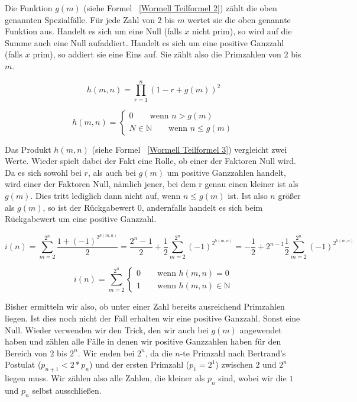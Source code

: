 \documentclass[11pt]{scrartcl}
\begin{document}
Die Funktion $g(m)$ (siehe Formel ~\ref{Wormell Teilformel 2}) zählt die oben genannten Spezialfälle. Für jede Zahl von $2$ bis $m$ wertet sie die oben genannte Funktion aus. Handelt es sich um eine Null (falls $x$ nicht prim), so wird auf die Summe auch eine Null aufaddiert. Handelt es sich um eine positive Ganzzahl (falls $x$ prim), so addiert sie eine Eins auf. Sie zählt also die Primzahlen von $2$ bis $m$.

\begin{equation}
h(m,n) = \prod_{r=1}^{n}{(1-r+g(m))^2}
\label{Wormell Teilformel 3}
\end{equation}

\begin{equation}
h(m,n) = 
\begin{cases}
    0 \qquad{} \text{wenn }n>g(m) \\
    N \in \mathbb{N} \qquad{} \text{wenn }n\leq g(m)
\end{cases}
\label{Wormell Teilformel 3 Text}
\end{equation}

Das Produkt $h(m,n)$ (siehe Formel ~\ref{Wormell Teilformel 3}) vergleicht zwei Werte. Wieder spielt dabei der Fakt eine Rolle, ob einer der Faktoren Null wird. Da es sich sowohl bei $r$, als auch bei $g(m)$ um positive Ganzzahlen handelt, wird einer der Faktoren Null, nämlich jener, bei dem r genau einen kleiner ist als $g(m)$. Dies tritt lediglich dann nicht auf, wenn $n \leq g(m)$ ist. Ist also $n$ größer als $g(m)$, so ist der Rückgabewert $0$, andernfalls handelt es sich beim Rückgabewert um eine positive Ganzzahl.

\begin{equation}
i(n) = \sum_{m=2}^{2^n}{\frac{1+(-1)^{2^{h(m,n)}}}{2}} = \frac{2^n-1}{2} + \frac{1}{2} \sum_{m=2}^{2^n}{(-1)^{2^{h(m,n)}}} = -\frac{1}{2} + 2^{n-1}  \frac{1}{2} \sum_{m=2}^{2^n}{(-1)^{2^{h(m,n)}}}
\label{Wormell Teilformel 4}
\end{equation}

\begin{equation}
i(n) = \sum_{m=2}^{2^n}
\begin{cases}
    0 \qquad{} \text{wenn }h(m,n)=0 \\
    1 \qquad{} \text{wenn }h(m,n) \in \mathbb{N}
\end{cases}
\label{Wormell Teilformel 4 Text}
\end{equation}

Bisher ermitteln wir also, ob unter einer Zahl bereits ausreichend Primzahlen liegen. Ist dies noch nicht der Fall erhalten wir eine positive Ganzzahl. Sonst eine Null. Wieder verwenden wir den Trick, den wir auch bei $g(m)$ angewendet haben und zählen alle Fälle in denen wir positive Ganzzahlen haben für den Bereich von $2$ bis $2^n$. Wir enden bei $2^n$, da die $n$-te Primzahl nach Bertrand's Postulat\cite{bertrands_postulate} ($p_{n+1} < 2*p_n$) und der ersten Primzahl ($p_1 = 2^1$) zwischen $2$ und $2^n$ liegen muss. Wir zählen also alle Zahlen, die kleiner als $p_n$ sind, wobei wir die $1$ und $p_n$ selbst ausschließen.
\end{document}
